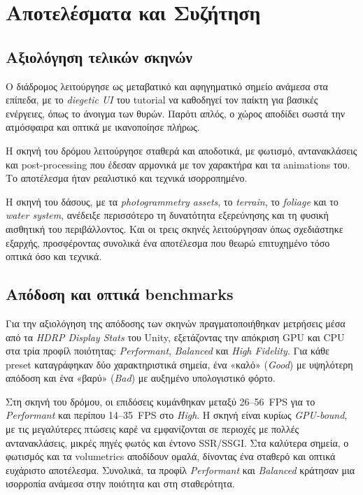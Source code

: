 \chapter{Αποτελέσματα και Συζήτηση}
\section{Αξιολόγηση τελικών σκηνών}

Ο διάδρομος λειτούργησε ως μεταβατικό και αφηγηματικό σημείο ανάμεσα στα επίπεδα, 
με το \textit{diegetic UI} του tutorial να καθοδηγεί τον παίκτη για βασικές ενέργειες, 
όπως το άνοιγμα των θυρών. 
Παρότι απλός, ο χώρος αποδίδει σωστά την ατμόσφαιρα και οπτικά με ικανοποίησε πλήρως.

Η σκηνή του δρόμου λειτούργησε σταθερά και αποδοτικά, 
με φωτισμό, αντανακλάσεις και post-processing που έδεσαν αρμονικά 
με τον χαρακτήρα και τα animations του. 
Το αποτέλεσμα ήταν ρεαλιστικό και τεχνικά ισορροπημένο.

Η σκηνή του δάσους, με τα \textit{photogrammetry assets}, 
το \textit{terrain}, το \textit{foliage} και το \textit{water system}, 
ανέδειξε περισσότερο τη δυνατότητα εξερεύνησης και τη φυσική αισθητική του περιβάλλοντος. 
Και οι τρεις σκηνές λειτούργησαν όπως σχεδιάστηκε εξαρχής, 
προσφέροντας συνολικά ένα αποτέλεσμα που θεωρώ επιτυχημένο 
τόσο οπτικά όσο και τεχνικά.
\section{Απόδοση και οπτικά benchmarks}
Για την αξιολόγηση της απόδοσης των σκηνών πραγματοποιήθηκαν μετρήσεις 
μέσα από τα \textit{HDRP Display Stats} του Unity, 
εξετάζοντας την απόκριση GPU και CPU στα τρία προφίλ ποιότητας: 
\textit{Performant}, \textit{Balanced} και \textit{High Fidelity}. 
Για κάθε preset καταγράφηκαν δύο χαρακτηριστικά σημεία,
ένα «καλό» (\textit{Good}) με υψηλότερη απόδοση και ένα «βαρύ» (\textit{Bad}) 
με αυξημένο υπολογιστικό φόρτο.

Στη σκηνή του δρόμου, οι επιδόσεις κυμάνθηκαν μεταξύ 26–56~FPS για το \textit{Performant} 
και περίπου 14–35~FPS στο \textit{High}. 
Η σκηνή είναι κυρίως \textit{GPU-bound}, 
με τις μεγαλύτερες πτώσεις καρέ να εμφανίζονται σε περιοχές 
με πολλές αντανακλάσεις, μικρές πηγές φωτός και έντονο SSR/SSGI. 
Στα καλύτερα σημεία, ο φωτισμός και τα volumetrics αποδίδουν ομαλά, 
δίνοντας ένα σταθερό και οπτικά ευχάριστο αποτέλεσμα. 
Συνολικά, τα προφίλ \textit{Performant} και \textit{Balanced} 
κράτησαν μια ισορροπία ανάμεσα στην ποιότητα και στη σταθερότητα.

